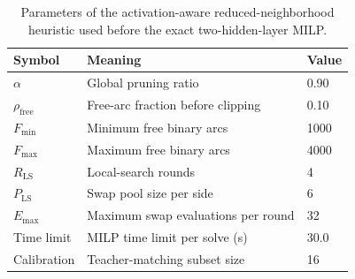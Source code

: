 \begin{table}[H]
    \centering
    \caption{Parameters of the activation-aware reduced-neighborhood heuristic used before the exact two-hidden-layer MILP.}
    \label{tab:reduced_neighborhood_params}
    \begin{tabular}{lll}
        \toprule
        \textbf{Symbol} & \textbf{Meaning} & \textbf{Value} \\
        \midrule
        $\alpha$ & Global pruning ratio & 0.90 \\
        $\rho_{\mathrm{free}}$ & Free-arc fraction before clipping & 0.10 \\
        $F_{\min}$ & Minimum free binary arcs & 1000 \\
        $F_{\max}$ & Maximum free binary arcs & 4000 \\
        $R_{\mathrm{LS}}$ & Local-search rounds & 4 \\
        $P_{\mathrm{LS}}$ & Swap pool size per side & 6 \\
        $E_{\max}$ & Maximum swap evaluations per round & 32 \\
        Time limit & MILP time limit per solve (s) & 30.0 \\
        Calibration & Teacher-matching subset size & 16 \\
        \bottomrule
    \end{tabular}
\end{table}
